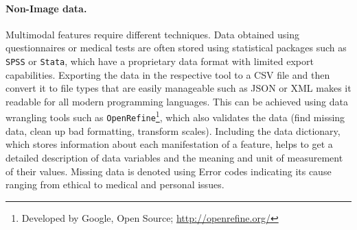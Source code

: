 \documentclass[journal]{style/vgtc} 			          %
\begin{document}
\paragraph{Non-Image data. }
%
Multimodal features require different techniques.
%
Data obtained using questionnaires or medical tests are often stored using statistical packages such as \texttt{SPSS} or \texttt{Stata}, which have a proprietary data format with limited export capabilities.
%
Exporting the data in the respective tool to a CSV file and then convert it to file types that are easily manageable such as JSON or XML makes it readable for all modern programming languages.
%
This can be achieved using data wrangling tools such as \texttt{OpenRefine}\footnote{Developed by Google, Open Source; \url{http://openrefine.org/}}, which also validates the data (find missing data, clean up bad formatting, transform scales).
%
Including the data dictionary, which stores information about each manifestation of a feature, helps to get a detailed description of data variables and the meaning and unit of measurement of their values.
%
Missing data is denoted using Error codes indicating its cause ranging from ethical to medical and personal issues.
%
\end{document}
